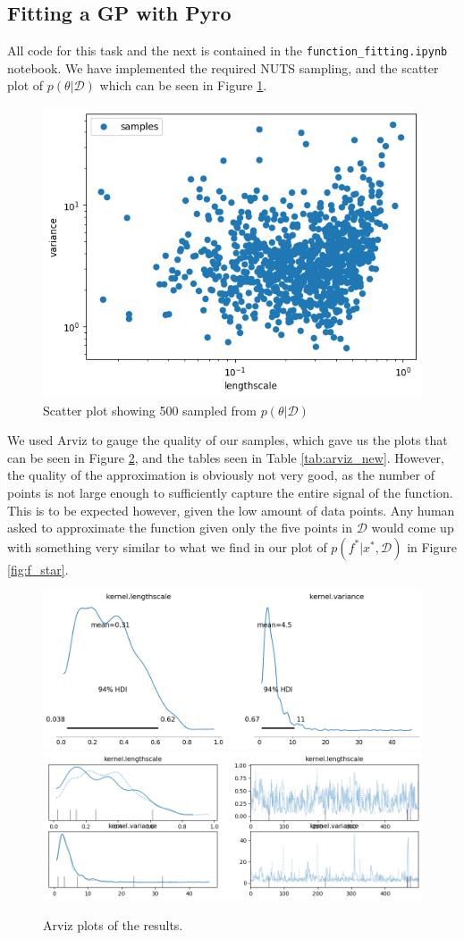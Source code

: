 \subsection{Fitting a GP with Pyro}
All code for this task and the next is contained in the \texttt{function\_fitting.ipynb} notebook. We have implemented the required NUTS sampling, and the scatter plot of $p(\theta | \mathcal{D})$ which can be seen in Figure \ref{fig:p_theta}.
\begin{figure}[h]
\centering
\includegraphics[width=0.5\linewidth]{images/p_theta.png}
\setlength{\belowcaptionskip}{-10pt}
\caption{Scatter plot showing 500 sampled from $p(\theta | \mathcal{D})$}
\label{fig:p_theta}
\end{figure}

We used Arviz to gauge the quality of our samples, which gave us the plots that can be seen in Figure \ref{fig:arviz_old}, and the tables seen in Table \ref{tab:arviz_new}. However, the quality of the approximation is obviously not very good, as the number of points is not large enough to sufficiently capture the entire signal of the function. This is to be expected however, given the low amount of data points. Any human asked to approximate the function given only the five points in $\mathcal{D}$ would come up with something very similar to what we find in our plot of $p(f^*|x^*,\mathcal{D})$ in Figure \ref{fig:f_star}.

\begin{figure}[h]
\centering
\includegraphics[width=0.49\linewidth]{images/arviz_single_0.png}
\includegraphics[width=0.49\linewidth]{images/arviz_single_1.png}
\setlength{\belowcaptionskip}{-10pt}
\caption{Arviz plots of the results.}
\label{fig:arviz_old}
\end{figure}

